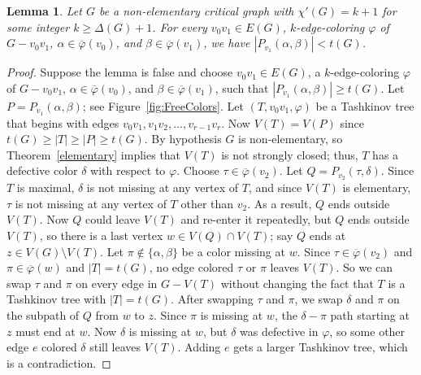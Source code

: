 \documentclass[12pt]{article}
\theoremstyle{plain}
\newtheorem{lem}[thm]{Lemma}
\theoremstyle{definition}
\theoremstyle{remark}
\newcommand{\card}[1]{\left|#1\right|}
\newcommand{\vph}{\varphi}
\newcommand{\vphn}{\overline{\varphi}}
\begin{document}

\begin{lem}
\label{FreeColorsLemma}
Let $G$ be a non-elementary critical graph with $\chi'(G) = k+1$ for some integer
$k \ge \Delta(G) + 1$.  For every $v_0v_1 \in E(G)$, $k$-edge-coloring $\vph$
of $G-v_0v_1$, $\alpha \in \vphn(v_0)$, and $\beta \in
\vphn(v_1)$, we have $\card{P_{v_1}(\alpha, \beta)} < t(G)$.
\end{lem}
\begin{proof}
Suppose the lemma is false and choose $v_0v_1 \in E(G)$, a $k$-edge-coloring
$\vph$ of $G-v_0v_1$, $\alpha \in \vphn(v_0)$, and $\beta \in \vphn(v_1)$, such
that $\card{P_{v_1}(\alpha, \beta)} \ge t(G)$.  Let $P = P_{v_1}(\alpha, \beta)$; see
Figure~\ref{fig:FreeColors}.  
Let $(T, v_0v_1, \vph)$ be a Tashkinov tree that
begins with edges $v_0v_1, v_1v_2, \ldots, v_{r-1}v_r$.  Now $V(T)=V(P)$ since
$t(G) \ge \card{T} \ge \card{P} \ge t(G)$.
By hypothesis $G$ is non-elementary, so Theorem~\ref{elementary} implies that
$V(T)$ is not strongly closed; thus, $T$ has a defective color $\delta$ with
respect to $\vph$.  Choose $\tau\in \vphn(v_2)$. Let $Q = P_{v_2}(\tau, \delta)$.
Since $T$ is maximal, $\delta$ is not missing at any vertex of $T$, and
since $V(T)$ is elementary, $\tau$ is not missing at any vertex of $T$ other 
than $v_2$.  As a result, $Q$ ends outside $V(T)$.  Now $Q$ could leave
$V(T)$ and re-enter it repeatedly, but $Q$ ends outside $V(T)$, so there is a
last vertex $w \in V(Q) \cap V(T)$; say $Q$ ends at $z \in V(G)\setminus V(T)$.
 Let $\pi \notin \{\alpha, \beta\}$ be a color missing at $w$.  
Since $\tau\in\vphn(v_2)$ and $\pi\in\vphn(w)$ and $\card{T} = t(G)$, no edge
colored $\tau$ or $\pi$ leaves $V(T)$.  So we can swap $\tau$ and $\pi$ on
every edge in $G - V(T)$ without changing the fact that $T$ is a Tashkinov tree
with $\card{T} = t(G)$.  After swapping $\tau$ and $\pi$, we swap $\delta$ and $\pi$
on the subpath of $Q$ from $w$ to $z$. Since $\pi$ is missing at $w$, the
$\delta-\pi$ path starting at $z$ must end at $w$.  Now $\delta$ is missing at
$w$, but $\delta$ was defective in $\vph$, so some other edge $e$ colored
$\delta$ still leaves $V(T)$. Adding $e$ gets a larger Tashkinov tree, which is
a contradiction.
\end{proof}
\end{document}
